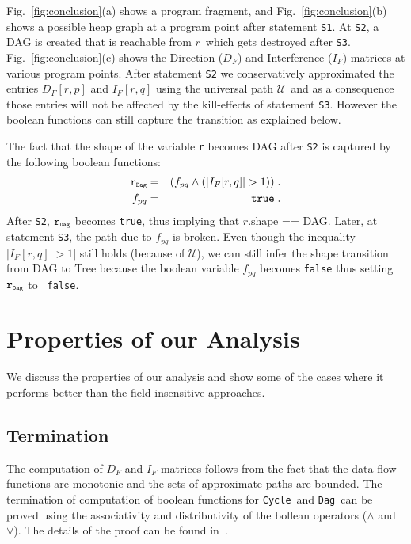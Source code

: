\documentclass[runningheads,a4paper]{llncs}
\newcommand{\myr}{\ensuremath{r}}
\newcommand{\upath}{\ensuremath{\mathcal{U}}}
\newcommand{\shape}{\mbox{shape}}
\newcommand{\subD}{\mbox{\scalebox{.6}{\Dag}}}
\newcommand{\mb}[1]{\mbox{{\tt #1}}}
\newcommand{\DFM}[2]{\ensuremath{D_F[#1,#2]}}
\newcommand{\IFM}[2]{\ensuremath{I_F[#1,#2]}}
\newcommand{\Dag}{{\tt Dag}}
\newcommand{\Cycle}{{\tt Cycle}}
\newcommand{\sub}[2]{\ensuremath{{#1}_{#2}}}
\begin{document}
\begin{example} {\rm
 Fig.~\ref{fig:conclusion}(a) shows a program fragment, and
 Fig.~\ref{fig:conclusion}(b) shows a possible heap graph at
 a program point after statement {\tt S1}.  At {\tt S2}, a
 DAG is created that is reachable from \myr\ which gets
 destroyed after {\tt S3}.  
 Fig.~\ref{fig:conclusion}(c) shows the Direction
 ($\sub{D}{F}$) and Interference ($\sub{I}{F}$) matrices at
 various program points.  After statement {\tt S2} we
 conservatively approximated the entries \DFM{r}{p} and
 \IFM{r}{q} using the universal path \upath\ and as a
 consequence those entries will not be affected by the
 kill-effects of statement {\tt S3}. However the boolean
 functions can still capture the transition as explained
 below. 

 The fact that the shape of the variable {\tt r} becomes DAG
 after {\tt S2} is captured by the following boolean
 functions:
 \begin{eqnarray*}
   \mb{r}_{\subD} &=&   (\sub{f}{pq} \wedge (|\IFM{r}{q}| > 1)) \; . \\
   \sub{f}{pq} &=& \mb{true} \; .
 \end{eqnarray*}
 After {\tt S2}, $\mb{r}_{\subD}$ becomes {\tt true}, thus
 implying that $\myr.\shape$ == DAG.  Later, at statement
 {\tt S3}, the path due to $\sub{f}{pq}$ is broken. Even
 though the inequality $| \IFM{r}{q} | > 1 |$ still holds
 (because of \upath), we can still infer the shape transition
 from DAG to Tree because the boolean variable $\sub{f}{pq}$
 becomes {\tt false} thus setting $\mb{r}_{\subD}$ to {\tt
   false}.  } \hfill\psframebox{}
\end{example}
\section{Properties of our Analysis}
We discuss the properties of our analysis and show some of
the cases where it performs better than the field insensitive
approaches.
\subsection{Termination} \label{Termination_Criteria}

The computation of $D_F$ and $I_F$ matrices follows from the
fact that the data flow functions are monotonic and the sets
of approximate paths are bounded. The termination of
computation of boolean functions for \Cycle\ and \Dag\ can be
proved using the associativity and distributivity of the
bollean operators ($\wedge$ and $\vee$). The details of the
proof can be found in~\cite{Sandeep11thesis}.
\end{document}

